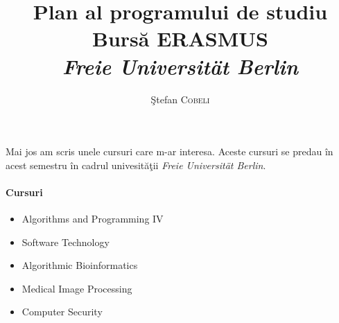 \documentclass{article}
\title{\textbf{Plan al programului de studiu } \\ Burs\u a ERASMUS \\ \textit{ \textit{Freie Universit\" at Berlin}} } %
\author{\c Stefan \textsc{Cobeli}} %
\date{}
\begin{document}
\maketitle %





Mai jos am scris unele cursuri care m-ar interesa. Aceste cursuri se predau \^ in acest semestru \^ in cadrul univesit\u a\c tii \textit{Freie Universit\" at Berlin}.
\paragraph{Cursuri}

\begin{itemize}

\item Algorithms and Programming IV
\item Software Technology
\item Algorithmic Bioinformatics 
\item Medical Image Processing
\item Computer Security

\end{itemize}
\end{document}
